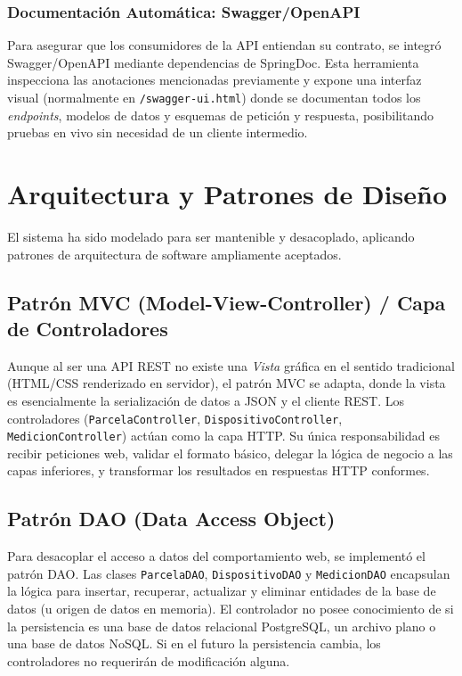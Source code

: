 \documentclass[12pt,a4paper]{article}
\begin{document}
\subsubsection{Documentación Automática: Swagger/OpenAPI}
Para asegurar que los consumidores de la API entiendan su contrato, se integró Swagger/OpenAPI mediante dependencias de SpringDoc. Esta herramienta inspecciona las anotaciones mencionadas previamente y expone una interfaz visual (normalmente en \texttt{/swagger-ui.html}) donde se documentan todos los \textit{endpoints}, modelos de datos y esquemas de petición y respuesta, posibilitando pruebas en vivo sin necesidad de un cliente intermedio.

\newpage

\section{Arquitectura y Patrones de Diseño}

El sistema ha sido modelado para ser mantenible y desacoplado, aplicando patrones de arquitectura de software ampliamente aceptados.

\subsection{Patrón MVC (Model-View-Controller) / Capa de Controladores}
Aunque al ser una API REST no existe una \textit{Vista} gráfica en el sentido tradicional (HTML/CSS renderizado en servidor), el patrón MVC se adapta, donde la vista es esencialmente la serialización de datos a JSON y el cliente REST. 
Los controladores (\texttt{ParcelaController}, \texttt{DispositivoController}, \texttt{MedicionController}) actúan como la capa HTTP. Su única responsabilidad es recibir peticiones web, validar el formato básico, delegar la lógica de negocio a las capas inferiores, y transformar los resultados en respuestas HTTP conformes. 

\subsection{Patrón DAO (Data Access Object)}
Para desacoplar el acceso a datos del comportamiento web, se implementó el patrón DAO. Las clases \texttt{ParcelaDAO}, \texttt{DispositivoDAO} y \texttt{MedicionDAO} encapsulan la lógica para insertar, recuperar, actualizar y eliminar entidades de la base de datos (u origen de datos en memoria).
El controlador no posee conocimiento de si la persistencia es una base de datos relacional PostgreSQL, un archivo plano o una base de datos NoSQL. Si en el futuro la persistencia cambia, los controladores no requerirán de modificación alguna.
\end{document}
